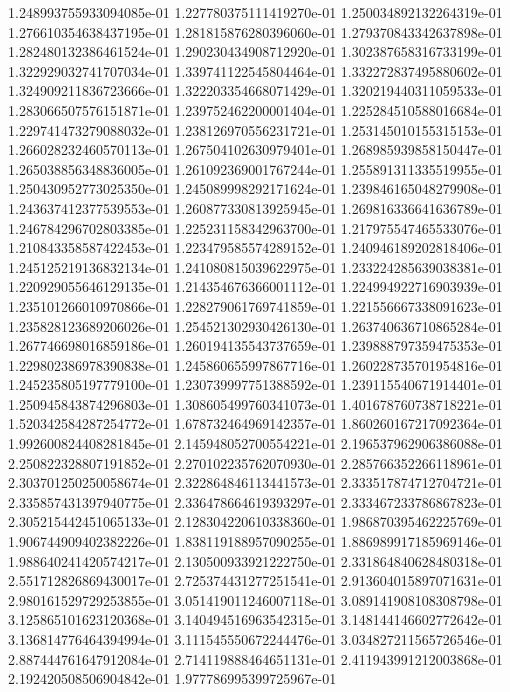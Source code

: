 1.248993755933094085e-01
1.227780375111419270e-01
1.250034892132264319e-01
1.276610354638437195e-01
1.281815876280396060e-01
1.279370843342637898e-01
1.282480132386461524e-01
1.290230434908712920e-01
1.302387658316733199e-01
1.322929032741707034e-01
1.339741122545804464e-01
1.332272837495880602e-01
1.324909211836723666e-01
1.322203354668071429e-01
1.320219440311059533e-01
1.283066507576151871e-01
1.239752462200001404e-01
1.225284510588016684e-01
1.229741473279088032e-01
1.238126970556231721e-01
1.253145010155315153e-01
1.266028232460570113e-01
1.267504102630979401e-01
1.268985939858150447e-01
1.265038856348836005e-01
1.261092369001767244e-01
1.255891311335519955e-01
1.250430952773025350e-01
1.245089998292171624e-01
1.239846165048279908e-01
1.243637412377539553e-01
1.260877330813925945e-01
1.269816336641636789e-01
1.246784296702803385e-01
1.225231158342963700e-01
1.217975547465533076e-01
1.210843358587422453e-01
1.223479585574289152e-01
1.240946189202818406e-01
1.245125219136832134e-01
1.241080815039622975e-01
1.233224285639038381e-01
1.220929055646129135e-01
1.214354676366001112e-01
1.224994922716903939e-01
1.235101266010970866e-01
1.228279061769741859e-01
1.221556667338091623e-01
1.235828123689206026e-01
1.254521302930426130e-01
1.263740636710865284e-01
1.267746698016859186e-01
1.260194135543737659e-01
1.239888797359475353e-01
1.229802386978390838e-01
1.245860655997867716e-01
1.260228735701954816e-01
1.245235805197779100e-01
1.230739997751388592e-01
1.239115540671914401e-01
1.250945843874296803e-01
1.308605499760341073e-01
1.401678760738718221e-01
1.520342584287254772e-01
1.678732464969142357e-01
1.860260167217092364e-01
1.992600824408281845e-01
2.145948052700554221e-01
2.196537962906386088e-01
2.250822328807191852e-01
2.270102235762070930e-01
2.285766352266118961e-01
2.303701250250058674e-01
2.322864846113441573e-01
2.333517874712704721e-01
2.335857431397940775e-01
2.336478664619393297e-01
2.333467233786867823e-01
2.305215442451065133e-01
2.128304220610338360e-01
1.986870395462225769e-01
1.906744909402382226e-01
1.838119188957090255e-01
1.886989917185969146e-01
1.988640241420574217e-01
2.130500933921222750e-01
2.331864840628480318e-01
2.551712826869430017e-01
2.725374431277251541e-01
2.913604015897071631e-01
2.980161529729253855e-01
3.051419011246007118e-01
3.089141908108308798e-01
3.125865101623120368e-01
3.140494516963542315e-01
3.148144146602772642e-01
3.136814776464394994e-01
3.111545550672244476e-01
3.034827211565726546e-01
2.887444761647912084e-01
2.714119888464651131e-01
2.411943991212003868e-01
2.192420508506904842e-01
1.977786995399725967e-01
